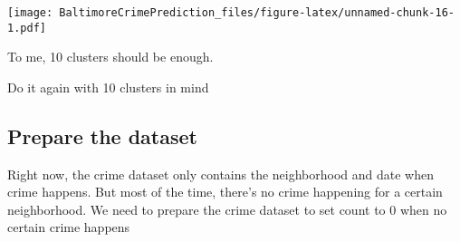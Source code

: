 \documentclass[]{article}
\newenvironment{Shaded}{\begin{snugshade}}{\end{snugshade}}
\newcommand{\KeywordTok}[1]{\textcolor[rgb]{0.13,0.29,0.53}{\textbf{#1}}}
\newcommand{\DataTypeTok}[1]{\textcolor[rgb]{0.13,0.29,0.53}{#1}}
\newcommand{\DecValTok}[1]{\textcolor[rgb]{0.00,0.00,0.81}{#1}}
\newcommand{\StringTok}[1]{\textcolor[rgb]{0.31,0.60,0.02}{#1}}
\newcommand{\OperatorTok}[1]{\textcolor[rgb]{0.81,0.36,0.00}{\textbf{#1}}}
\newcommand{\NormalTok}[1]{#1}
\begin{document}
\texttt{[image: BaltimoreCrimePrediction\_files/figure-latex/unnamed-chunk-16-1.pdf]}

To me, 10 clusters should be enough.

Do it again with 10 clusters in mind

\begin{Shaded}
\end{Shaded}

\subsection{Prepare the dataset}\label{prepare-the-dataset}

Right now, the crime dataset only contains the neighborhood and date
when crime happens. But most of the time, there's no crime happening for
a certain neighborhood. We need to prepare the crime dataset to set
count to 0 when no certain crime happens
\end{document}
